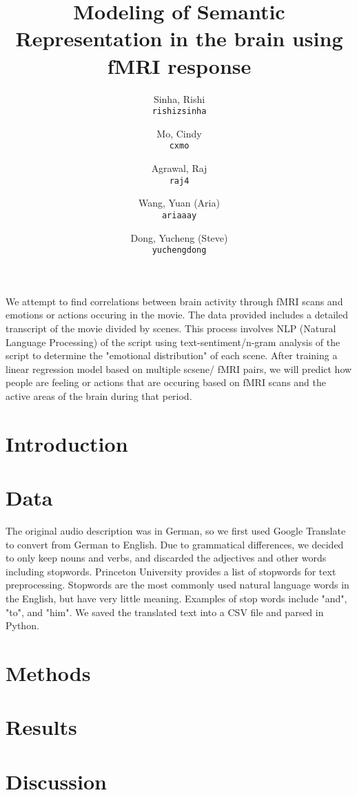 \documentclass[11pt]{article}
\title{Modeling of Semantic Representation in the brain using fMRI response}
\author{
  Sinha, Rishi\\
  \texttt{rishizsinha}
  \and
  Mo, Cindy\\
  \texttt{cxmo}
  \and
  Agrawal, Raj\\
  \texttt{raj4}
  \and
  Wang, Yuan (Aria)\\
  \texttt{ariaaay}
  \and
  Dong, Yucheng (Steve)\\
  \texttt{yuchengdong}
}
\begin{document}
\maketitle

We attempt to find correlations between brain activity through fMRI scans and emotions 
or actions occuring in the movie. The data provided includes a detailed transcript of 
the movie divided by scenes. This process involves NLP (Natural Language Processing) of 
the script using text-sentiment/n-gram analysis of the script to determine the "emotional 
distribution" of each scene. After training a linear regression model based on multiple 
scsene/ fMRI pairs, we will predict how people are feeling or actions that are occuring 
based on fMRI scans and the active areas of the brain during that period.  

\section{Introduction}

\section{Data}
 The original audio description was in German, so we first used Google Translate 
 to convert from German to English. Due to grammatical differences, we decided to
 only keep nouns and verbs, and discarded the adjectives and other words including
 stopwords. Princeton University provides a list of stopwords for text preprocessing.
 Stopwords are the most commonly used natural language words in the English, but have 
 very little meaning. Examples of stop words include "and", "to", and "him". We saved 
 the translated text into a CSV file and parsed in Python. 

\section{Methods}
\section{Results}
\section{Discussion}



\end{document}
